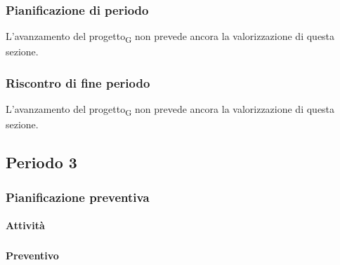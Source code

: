 \subsubsection{Pianificazione di periodo}


L'avanzamento del progetto\textsubscript{G} non prevede ancora la valorizzazione di questa sezione.



\subsubsection{Riscontro di fine periodo}

L'avanzamento del progetto\textsubscript{G} non prevede ancora la valorizzazione di questa sezione.





\pagebreak
\subsection{Periodo 3}

\subsubsection{Pianificazione preventiva}

\paragraph{Attività}
\subparagraph*{}

\planningTable{
	
}

\paragraph{Preventivo}
\subparagraph*{}

